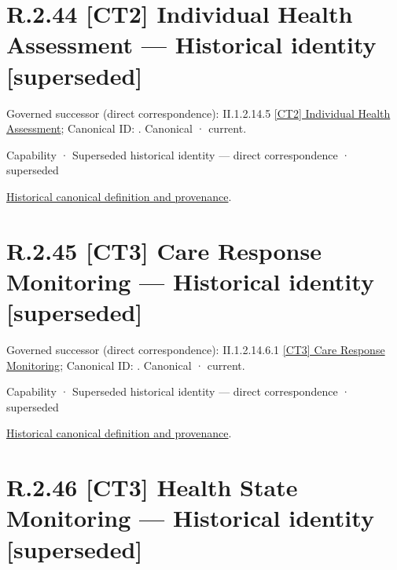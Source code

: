 \section*{R.2.44 [CT2] Individual Health Assessment — Historical identity [superseded]}
\label{navigation:R.2.44}

{\small Governed successor (direct correspondence): II.1.2.14.5 \hyperref[element:045f819bb3694d3c9db7f20886e2993f]{[CT2] Individual Health Assessment}; Canonical ID: \texttt{}. Canonical · current.}\par
\label{element:9111446aa2d045bd9acd98542b0eef1f}
{\small Capability · Superseded historical identity — direct correspondence · superseded}\par
\href{../../../../../../../continuum/strategy/capability/9111446aa2d045bd9acd98542b0eef1f.md}{Historical canonical definition and provenance}.\par
\section*{R.2.45 [CT3] Care Response Monitoring — Historical identity [superseded]}
\label{navigation:R.2.45}

{\small Governed successor (direct correspondence): II.1.2.14.6.1 \hyperref[element:d6951c9357fa40a4943cde581d95d5b1]{[CT3] Care Response Monitoring}; Canonical ID: \texttt{}. Canonical · current.}\par
\label{element:615f93d05fbb4a8481f07778bd4f4803}
{\small Capability · Superseded historical identity — direct correspondence · superseded}\par
\href{../../../../../../../continuum/strategy/capability/615f93d05fbb4a8481f07778bd4f4803.md}{Historical canonical definition and provenance}.\par
\section*{R.2.46 [CT3] Health State Monitoring — Historical identity [superseded]}
\label{navigation:R.2.46}

